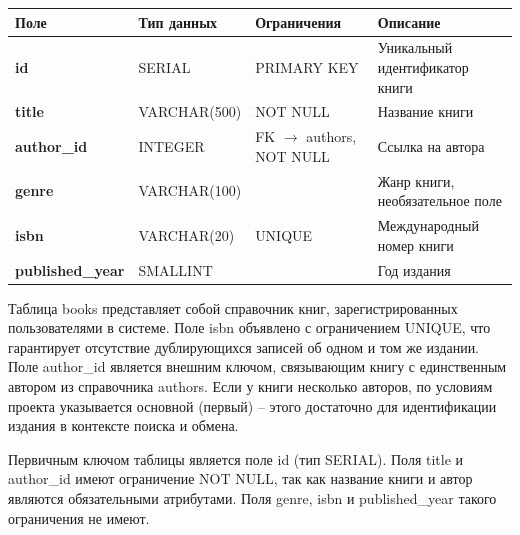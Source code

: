 \documentclass[14pt,a4paper]{extarticle}
\begin{document}
\begin{longtable}[]{@{}
  >{\centering\arraybackslash}p{}
  >{\centering\arraybackslash}p{}
  >{\centering\arraybackslash}p{}
  >{\centering\arraybackslash}p{}@{}}
\toprule\noalign{}
\begin{minipage}[b]{\linewidth}\centering
\textbf{Поле}
\end{minipage} & \begin{minipage}[b]{\linewidth}\centering
\textbf{Тип данных}
\end{minipage} & \begin{minipage}[b]{\linewidth}\centering
\textbf{Ограничения}
\end{minipage} & \begin{minipage}[b]{\linewidth}\centering
\textbf{Описание}
\end{minipage} \\
\midrule\noalign{}
\endhead
\bottomrule\noalign{}
\endlastfoot
\textbf{id} & SERIAL & PRIMARY KEY & Уникальный идентификатор книги \\
\textbf{title} & VARCHAR(500) & NOT NULL & Название книги \\
\textbf{author\_id} & INTEGER & FK $\rightarrow$ authors, NOT NULL & Ссылка на
автора \\
\textbf{genre} & VARCHAR(100) & & Жанр книги, необязательное поле \\
\textbf{isbn} & VARCHAR(20) & UNIQUE & Международный номер книги \\
\textbf{published\_year} & SMALLINT & & Год издания \\
\end{longtable}

Таблица books представляет собой справочник книг, зарегистрированных
пользователями в системе. Поле isbn объявлено с ограничением UNIQUE, что
гарантирует отсутствие дублирующихся записей об одном и том же издании.
Поле author\_id является внешним ключом, связывающим книгу с
единственным автором из справочника authors. Если у книги несколько
авторов, по условиям проекта указывается основной (первый) -- этого
достаточно для идентификации издания в контексте поиска и обмена.

Первичным ключом таблицы является поле id (тип SERIAL). Поля title и
author\_id имеют ограничение NOT NULL, так как название книги и автор
являются обязательными атрибутами. Поля genre, isbn и published\_year
такого ограничения не имеют.
\end{document}
